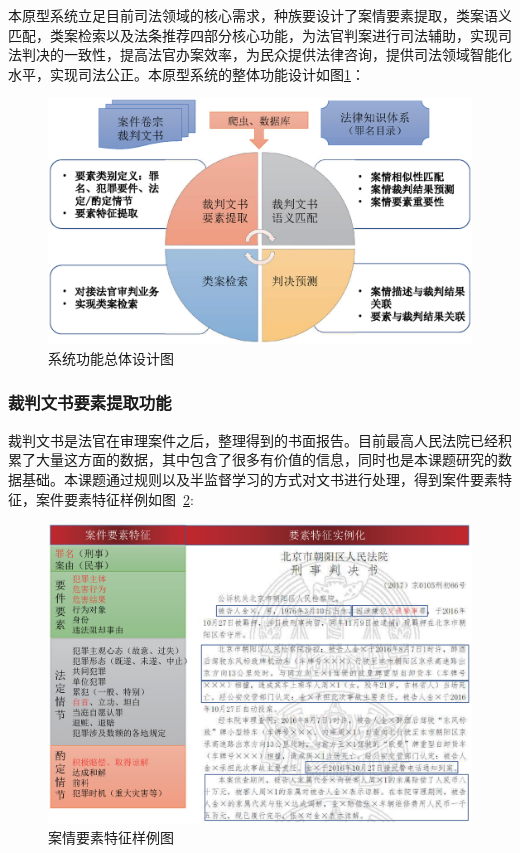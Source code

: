 本原型系统立足目前司法领域的核心需求，种族要设计了案情要素提取，类案语义匹配，类案检索以及法条推荐四部分核心功能，为法官判案进行司法辅助，实现司法判决的一致性，提高法官办案效率，为民众提供法律咨询，提供司法领域智能化水平，实现司法公正。本原型系统的整体功能设计如图\ref{fig:sys_main}：
\begin{figure}[htbp]%
    \centering
    \includegraphics[scale=0.5, clip=true]{./sources/sys_main.eps}
    \caption{\label{fig:sys_main}系统功能总体设计图}
\end{figure}



\subsubsection{裁判文书要素提取功能}

裁判文书是法官在审理案件之后，整理得到的书面报告。目前最高人民法院已经积累了大量这方面的数据，其中包含了很多有价值的信息，同时也是本课题研究的数据基础。本课题通过规则以及半监督学习的方式对文书进行处理，得到案件要素特征，案件要素特征样例如图~\ref{fig:sys_element_demo}:
\begin{figure}[htbp]%
    \centering
    \includegraphics[scale=0.5, clip=true]{./sources/sys_element_demo.eps}
    \caption{\label{fig:sys_element_demo}案情要素特征样例图}
\end{figure}

